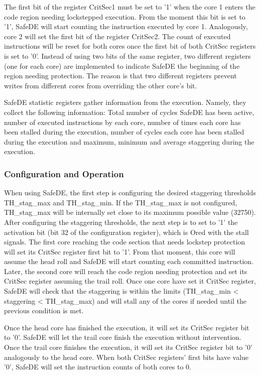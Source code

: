 The first bit of the register CritSec1 must be set to '1' when the core 1 enters the code region needing lockstepped execution. From the moment this bit is set to '1', SafeDE will start counting the instruction executed by core 1. Analogously, core 2 will set the first bit of the register CritSec2. The count of executed instructions will be reset for both cores once the first bit of both CritSec registers is set to '0'. Instead of using two bits of the same register, two different registers (one for each core) are implemented to indicate SafeDE the beginning of the region needing protection. The reason is that two different registers prevent writes from different cores from overriding the other core's bit.

SafeDE statistic registers gather information from the execution. Namely, they collect the following information: Total number of cycles SafeDE has been active, number of executed instructions by each core, number of times each core has been stalled during the execution, number of cycles each core has been stalled during the execution and maximum, minimum and average staggering during the execution.


\bigskip

\subsubsection{Configuration and Operation}

When using SafeDE, the first step is configuring the desired staggering thresholds TH\_stag\_max and TH\_stag\_min. If the TH\_stag\_max is not configured, TH\_stag\_max will be internally set close to its maximum possible value (32750). After configuring the staggering thresholds, the next step is to set to '1' the activation bit (bit 32 of the configuration register), which is Ored with the stall signals. The first core reaching the code section that needs lockstep protection will set its CritSec register first bit to '1'. From that moment, this core will assume the head roll and SafeDE will start counting each committed instruction. Later, the second core will reach the code region needing protection and set its CritSec register assuming the trail roll. Once one core have set it CritSec register, SafeDE will check that the staggering is within the limits (TH\_stag\_min < staggering < TH\_stag\_max) and will stall any of the cores if needed until the previous condition is met.  

Once the head core has finished the execution, it will set its CritSec register bit to '0'. SafeDE will let the trail core finish the execution without intervention. Once the trail core finishes the execution, it will set its CritSec register bit to '0' analogously to the head core. When both CritSec registers' first bits have value '0', SafeDE will set the instruction counts of both cores to 0.
\bigskip

